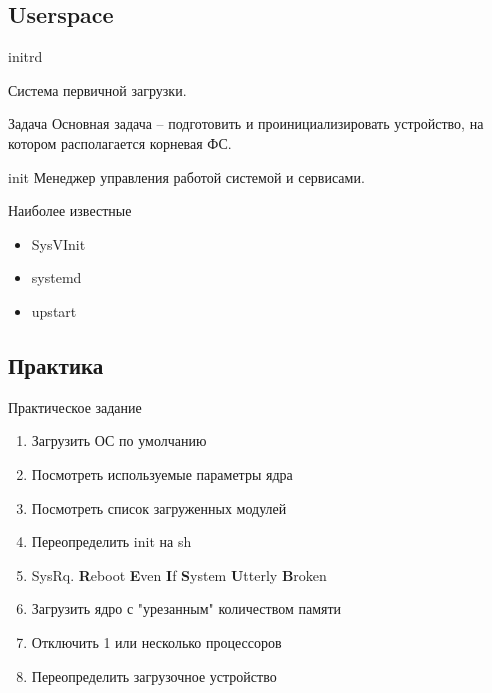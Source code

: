\documentclass[ignorenonframetext, professionalfonts, hyperref={pdftex, unicode}]{beamer}
\begin{document}
\subsection{Userspace}

\begin{frame}{initrd}

	Система первичной загрузки.

	\begin{block}{Задача}
		Основная задача -- подготовить и проинициализировать
		устройство, на котором располагается корневая ФС.
	\end{block}
\end{frame}

\begin{frame}{init}
	Менеджер управления работой системой и сервисами.
	
	\bigskip


	\bigskip

	\begin{block}{Наиболее известные}
		\begin{itemize}
			\item SysVInit
			\item systemd
			\item upstart
		\end{itemize}
	\end{block}
\end{frame}

\subsection{Практика}

\begin{frame}{Практическое задание}
	\begin{enumerate}
		\item Загрузить ОС по умолчанию
		\item Посмотреть используемые параметры ядра 
		\item Посмотреть список загруженных модулей
			\pause
		\item Переопределить init на sh
		\item SysRq. {\bf R}eboot {\bf E}ven {\bf I}f {\bf S}ystem {\bf U}tterly {\bf B}roken
			\pause
		\item Загрузить ядро с "урезанным" количеством памяти
		\item Отключить 1 или несколько процессоров
			\pause
		\item Переопределить загрузочное устройство
	\end{enumerate}
\end{frame}
\end{document}
